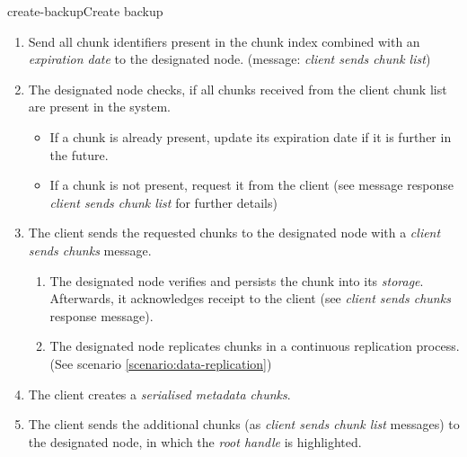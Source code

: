 \begin{scenario}{create-backup}{Create backup}
\begin{enumerate}
\begin{enumerate}
   				\item Send all chunk identifiers present in the chunk index combined with an \emph{expiration date} to the designated node. (message: \emph{client sends chunk list})
   				\item The designated node checks, if all chunks received from the client chunk list are present in the system.
   					\begin{itemize}
   						\item If a chunk is already present, update its expiration date if it is further in the future.
   						\item If a chunk is not present, request it from the client (see message response \emph{client sends chunk list} for further details)
   					\end{itemize}
   				\item The client sends the requested chunks to the designated node with a \emph{client sends chunks} message. %
   					\begin{enumerate}
   						\item The designated node verifies and persists the chunk into its \emph{storage}. Afterwards, it acknowledges receipt to the client (see \emph{client sends chunks} response message).
   						\item The designated node replicates chunks in a continuous replication process. (See scenario \ref{scenario:data-replication})
   					\end{enumerate}
   				\item The client creates a \emph{serialised metadata chunks}. %
   				\item The client sends the additional chunks (as \emph{client sends chunk list} messages) to the designated node, in which the \emph{root handle} is highlighted. %
   			\end{enumerate}
    \end{enumerate}
    

\end{scenario}
